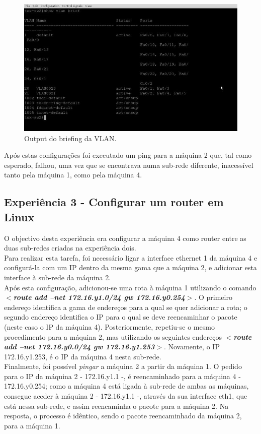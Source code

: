 \documentclass[a4paper]{article}
\begin{document}
\begin{figure}[h!]
\centering
\includegraphics[scale=0.3]{res/image3.jpg}
\caption{Output do briefing da VLAN.}
\end{figure}

Após estas configurações foi executado um ping para a máquina 2 que, tal como esperado, falhou, uma vez que se encontrava numa sub-rede diferente, inacessível tanto pela máquina 1, como pela máquina 4.

\subsection{Experiência 3 - Configurar um router em Linux}
O objectivo desta experiência era configurar a máquina 4 como router entre as duas sub-redes criadas na experiência dois.\\
Para realizar esta tarefa, foi necessário ligar a interface ethernet 1 da máquina 4 e configurá-la com um IP dentro da mesma gama que a máquina 2, e adicionar esta interface à sub-rede da máquina 2.\\
Após esta configuração, adicionou-se uma rota à máquina 1 utilizando o comando \textbf{\textit{$<$route add –net  172.16.y1.0/24 gw 172.16.y0.254$>$}}. O primeiro endereço identifica a gama de endereços para a qual se quer adicionar a rota; o segundo endereço identifica o IP para o qual se deve reencaminhar o pacote (neste caso o IP da máquina 4). Posteriormente, repetiu-se o mesmo procedimento para a máquina 2, mas utilizando os seguintes endereços \textbf{\textit{$<$route add –net 172.16.y0.0/24 gw 172.16.y1.253$>$}}. Novamente, o IP 172.16.y1.253, é o IP da máquina 4 nesta sub-rede.\\
Finalmente, foi possível \emph{pingar} a máquina 2 a partir da máquina 1. O pedido para o IP da máquina 2 - 172.16.y1.1 -, é reencaminhado para a máquina 4 - 172.16.y0.254; como a máquina 4 está ligada à sub-rede de ambas as máquinas, consegue aceder à máquina 2 - 172.16.y1.1 -, através da sua interface eth1, que está nessa sub-rede, e assim reencaminha o pacote para a máquina 2. Na resposta, o processo é idêntico, sendo o pacote reencaminhado da máquina 2, para a máquina 1.
\end{document}
